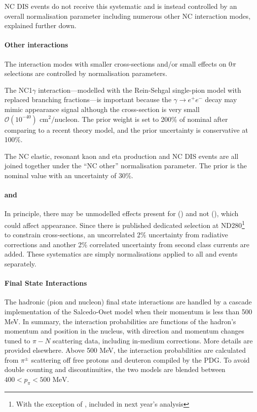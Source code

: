NC DIS events do not receive this systematic and is instead controlled by an overall normalisation parameter including numerous other NC interaction modes, explained further down.

\paragraph{Other interactions}
The interaction modes with smaller cross-sections and/or small effects on 0$\pi$ selections are controlled by normalisation parameters.

The NC1$\gamma$ interaction---modelled with the Rein-Sehgal single-pion model with replaced branching fractions---is important because the $\gamma \rightarrow e^+ e^-$ decay may mimic \nue appearance signal although the cross-section is very small $\mathcal{O}(10^{-40}) \text{ cm}^2/\text{nucleon}$\cite{thesis_pierre}. The prior weight is set to 200\% of nominal after comparing to a recent theory model\cite{nc1gamma}, and the prior uncertainty is conservative at 100\%.

The NC elastic, resonant kaon and eta production and NC DIS events are all joined together under the ``NC other'' normalisation parameter. The prior is the nominal value with an uncertainty of 30\%.

\paragraph{\nue and \nuebar}
In principle, there may be unmodelled effects present for \nue (\nuebar) and not \numu (\numubar), which could affect \nue appearance. Since there is published dedicated \nue selection at ND280\footnote{With the exception of \cite{thesis_pierre}, included in next year's analysis} to constrain \nue cross-sections, an uncorrelated 2\% uncertainty from radiative corrections and another 2\% correlated uncertainty from second class currents are added\cite{kevin_nue_numu}. These systematics are simply normalisations applied to all \nue and \nuebar events separately.

\paragraph{Final State Interactions}
The hadronic (pion and nucleon) final state interactions are handled by a cascade implementation of the Salcedo-Oset model \cite{salcedo_oset} when their momentum is less than 500 MeV. In summary, the interaction probabilities are functions of the hadron's momentum and position in the nucleus, with direction and momentum changes tuned to $\pi-N$ scattering data\cite{pion_scattering}, including in-medium corrections\cite{seki}. More details are provided elsewhere\cite{neut}. Above 500 MeV, the interaction probabilities are calculated from $\pi^\pm$ scattering off free protons and deuteron compiled by the PDG\cite{pdg_2010}. To avoid double counting and discontinuities, the two models are blended between $400 < p_\pi<500 \text{ MeV}$. 

